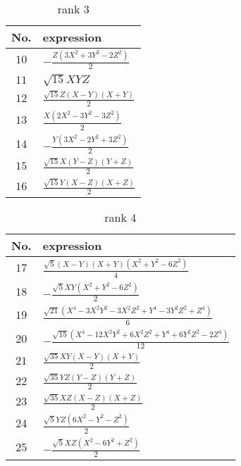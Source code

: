 \documentclass[fleqn,8pt,landscape]{jsarticle}
\begin{document}
\begin{table}[ht!]
\begin{center}
\caption{rank 3}
\renewcommand{\arraystretch}{1.3}
\begin{tabular}{cl} \hline \hline
No. & expression \\ \hline
$ 10 $ & $ - \frac{Z \left(3 X^{2} + 3 Y^{2} - 2 Z^{2}\right)}{2} $ \\
$ 11 $ & $ \sqrt{15} X Y Z $ \\
$ 12 $ & $ \frac{\sqrt{15} Z \left(X - Y\right) \left(X + Y\right)}{2} $ \\
$ 13 $ & $ \frac{X \left(2 X^{2} - 3 Y^{2} - 3 Z^{2}\right)}{2} $ \\
$ 14 $ & $ - \frac{Y \left(3 X^{2} - 2 Y^{2} + 3 Z^{2}\right)}{2} $ \\
$ 15 $ & $ \frac{\sqrt{15} X \left(Y - Z\right) \left(Y + Z\right)}{2} $ \\
$ 16 $ & $ \frac{\sqrt{15} Y \left(X - Z\right) \left(X + Z\right)}{2} $ \\
 \hline \hline
\end{tabular}
\end{center}
\end{table}
\begin{table}[ht!]
\begin{center}
\caption{rank 4}
\renewcommand{\arraystretch}{1.3}
\begin{tabular}{cl} \hline \hline
No. & expression \\ \hline
$ 17 $ & $ \frac{\sqrt{5} \left(X - Y\right) \left(X + Y\right) \left(X^{2} + Y^{2} - 6 Z^{2}\right)}{4} $ \\
$ 18 $ & $ - \frac{\sqrt{5} X Y \left(X^{2} + Y^{2} - 6 Z^{2}\right)}{2} $ \\
$ 19 $ & $ \frac{\sqrt{21} \left(X^{4} - 3 X^{2} Y^{2} - 3 X^{2} Z^{2} + Y^{4} - 3 Y^{2} Z^{2} + Z^{4}\right)}{6} $ \\
$ 20 $ & $ - \frac{\sqrt{15} \left(X^{4} - 12 X^{2} Y^{2} + 6 X^{2} Z^{2} + Y^{4} + 6 Y^{2} Z^{2} - 2 Z^{4}\right)}{12} $ \\
$ 21 $ & $ \frac{\sqrt{35} X Y \left(X - Y\right) \left(X + Y\right)}{2} $ \\
$ 22 $ & $ \frac{\sqrt{35} Y Z \left(Y - Z\right) \left(Y + Z\right)}{2} $ \\
$ 23 $ & $ \frac{\sqrt{35} X Z \left(X - Z\right) \left(X + Z\right)}{2} $ \\
$ 24 $ & $ \frac{\sqrt{5} Y Z \left(6 X^{2} - Y^{2} - Z^{2}\right)}{2} $ \\
$ 25 $ & $ - \frac{\sqrt{5} X Z \left(X^{2} - 6 Y^{2} + Z^{2}\right)}{2} $ \\
 \hline \hline
\end{tabular}
\end{center}
\end{table}
\end{document}
